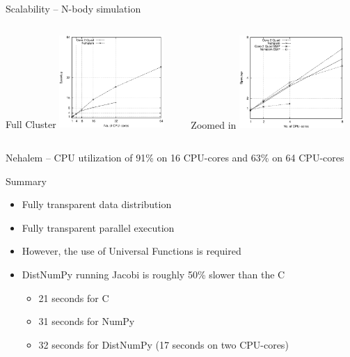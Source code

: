 \documentclass{beamer}
\begin{document}
\begin{frame}{Scalability -- N-body simulation}
\begin{scriptsize}
\begin{columns}
  \begin{column}{0.5\textwidth}
  \begin{center}
    \hspace{21px}Full Cluster
    \includegraphics[width=150px]{../gfx/NbodyStrong}
  \end{center}
  \end{column}
  \begin{column}{0.5\textwidth}
  \begin{center}
    \hspace{23px}Zoomed in
    \includegraphics[width=150px]{../gfx/NbodyStrongSMP}
  \end{center}
  \end{column}
\end{columns}
\begin{center}
Nehalem -- CPU utilization of 91\% on 16 CPU-cores and 63\% on 64 CPU-cores
\end{center}
\end{scriptsize}
\end{frame}


\begin{frame}{Summary}
\begin{itemize}
  \item Fully transparent data distribution
  \item Fully transparent parallel execution
  \item However, the use of Universal Functions is required
  \item DistNumPy running Jacobi is roughly 50\% slower than the C
  \begin{itemize}
    \item 21 seconds for C
    \item 31 seconds for NumPy
    \item 32 seconds for DistNumPy (17 seconds on two CPU-cores)
  \end{itemize}
\end{itemize}
\end{frame}
\end{document}
